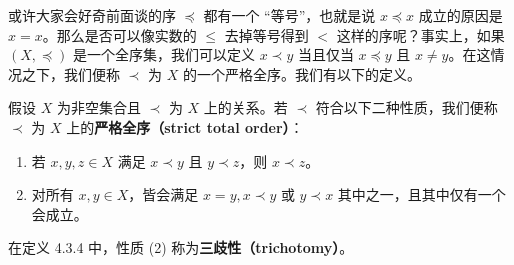 或许大家会好奇前面谈的序 $\preceq$ 都有一个 “等号”，也就是说 $x \preceq x$ 成立的原因是 $x = x$。那么是否可以像实数的 $\leq$ 去掉等号得到 $<$ 这样的序呢？事实上，如果 $(X, \preceq)$ 是一个全序集，我们可以定义 $x \prec y$ 当且仅当 $x \preceq y$ 且 $x \neq y$。在这情况之下，我们便称 $\prec$ 为 $X$ 的一个严格全序。我们有以下的定义。

\begin{definition}
假设 $X$ 为非空集合且 $\prec$ 为 $X$ 上的关系。若 $\prec$ 符合以下二种性质，我们便称 $\prec$ 为 $X$ 上的{\bf 严格全序（strict total order）}：
\begin{enumerate}
    \item 若 $x, y, z \in X$ 满足 $x \prec y$ 且 $y \prec z$，则 $x \prec z$。
    \item 对所有 $x, y \in X$，皆会满足 $x = y, x \prec y$ 或 $y \prec x$ 其中之一，且其中仅有一个会成立。
\end{enumerate}
\end{definition}

在定义 4.3.4 中，性质 (2) 称为\textbf{三歧性（trichotomy）}。

